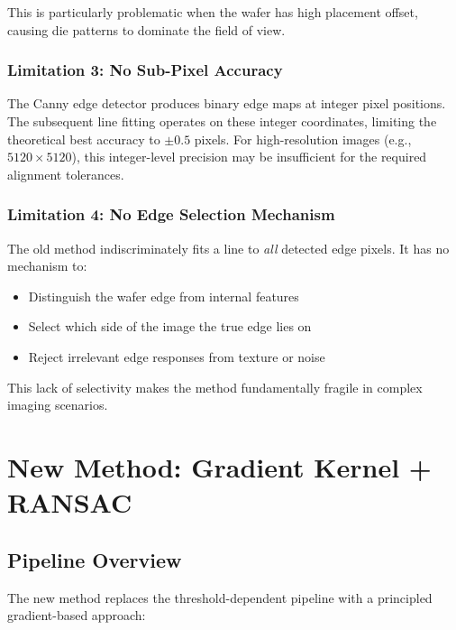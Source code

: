 \documentclass[12pt, a4paper]{article}
\begin{document}
This is particularly problematic when the wafer has high placement offset, causing die patterns to dominate the field of view.

\subsubsection{Limitation 3: No Sub-Pixel Accuracy}

The Canny edge detector produces binary edge maps at integer pixel positions. The subsequent line fitting operates on these integer coordinates, limiting the theoretical best accuracy to $\pm 0.5$ pixels. For high-resolution images (e.g., $5120 \times 5120$), this integer-level precision may be insufficient for the required alignment tolerances.

\subsubsection{Limitation 4: No Edge Selection Mechanism}

The old method indiscriminately fits a line to \emph{all} detected edge pixels. It has no mechanism to:
\begin{itemize}
    \item Distinguish the wafer edge from internal features
    \item Select which side of the image the true edge lies on
    \item Reject irrelevant edge responses from texture or noise
\end{itemize}

This lack of selectivity makes the method fundamentally fragile in complex imaging scenarios.

\section{New Method: Gradient Kernel + RANSAC}

\subsection{Pipeline Overview}

The new method replaces the threshold-dependent pipeline with a principled gradient-based approach:
\end{document}
